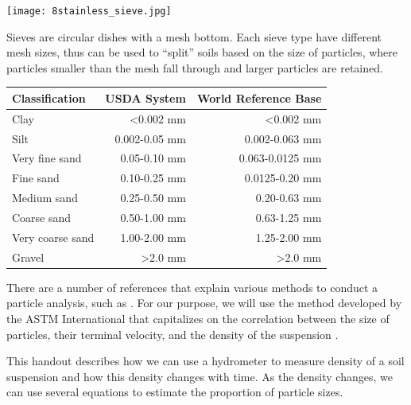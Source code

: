 \documentclass{tufte-handout}
\begin{document}
\begin{marginfigure}
	\texttt{[image: 8stainless\_sieve.jpg]}
	\caption{Sieves are circular dishes with a mesh bottom. Each sieve type have different mesh sizes, thus can be used to ``split'' soils based on the size of particles, where particles smaller than the mesh fall through and larger particles are retained.}
	\label{fig:8stainless_sieve}
\end{marginfigure}

\begin{table}
		\begin{tabular}{lrr}\hline
Classification 					&  USDA System 		& World Reference Base\\ \hline\hline
			Clay 							& <0.002 mm 			& <0.002 mm \\
			Silt 							& 0.002-0.05 mm 	& 0.002-0.063 mm\\
			Very fine sand		& 0.05-0.10 mm 		& 0.063-0.0125 mm\\
			Fine sand 				& 0.10-0.25 mm 		& 0.0125-0.20 mm\\
			Medium sand				& 0.25-0.50 mm 		& 0.20-0.63 mm\\
			Coarse sand 			& 0.50-1.00 mm 		& 0.63-1.25 mm\\
			Very coarse sand	& 1.00-2.00 mm 		& 1.25-2.00 mm\\
			Gravel 						& >2.0 mm 				& >2.0 mm \\ \hline
		\end{tabular}
\end{table}


There are a number of references that explain various methods to conduct a particle analysis, such as \citep{gee1986particle, day1965particle, beretta2014soil}. For our purpose, we will use the method developed by the ASTM International that capitalizes on the correlation between the size of particles, their terminal velocity, and the density of the suspension \citep{standard2007d422}. 

This handout describes how we can use a hydrometer to measure density of a soil suspension and how this density changes with time. As the density changes, we can use several equations to estimate the proportion of particle sizes. 
\end{document}
